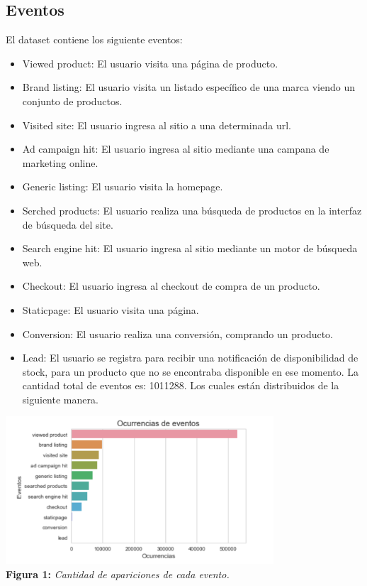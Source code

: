 \documentclass[titlepage,a4paper]{article}
\begin{document}
	\subsection{Eventos}
	El dataset contiene los siguiente eventos: 
	\begin{itemize}
	\item Viewed product: El usuario visita una página de producto.
	\item Brand listing: El usuario visita un listado específico de una marca viendo un conjunto de productos.
	\item Visited site: El usuario ingresa al sitio a una determinada url.
	\item Ad campaign hit:  El usuario ingresa al sitio mediante una campana de marketing online.
	\item Generic listing:  El usuario visita la homepage.
	\item Serched products:  El usuario realiza una búsqueda de productos en la interfaz de búsqueda del site.
	\item Search engine hit: El usuario ingresa al sitio mediante un motor de búsqueda web.
	\item Checkout: El usuario ingresa al checkout de compra de un producto.
	\item Staticpage: El usuario visita una página.
	\item Conversion: El usuario realiza una conversión, comprando un producto.
	\item Lead: El usuario se registra para recibir una notificación de disponibilidad de stock, para un producto que no se encontraba disponible en ese momento.
	\newpage
	La cantidad total de eventos es: 1011288. Los cuales están distribuidos de la siguiente manera. 
	\end{itemize}
	\begin{center}
	\includegraphics[width=10cm]{ocurrencia_eventos.jpg}\\
	\textbf{Figura 1:}  \textit{Cantidad de apariciones de cada evento. }
	\end{center}
\end{document}
